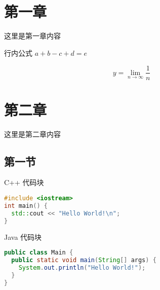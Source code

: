 \documentclass[a4paper]{article}
\begin{document}
\renewcommand{\contentsname}{目\ 录}
\renewcommand{\appendixname}{附录}
\renewcommand{\appendixpagename}{附录}
\renewcommand{\refname}{参考文献} 
\renewcommand{\figurename}{图}
\renewcommand{\tablename}{表}
\renewcommand{\today}{\number\year 年 \number\month 月 \number\day 日}


\begin{titlepage}

\begin{center}
  \vspace*{36pt}
   \\
  \vspace*{24pt}
   \\
  \vspace*{380pt}
\end{center}
\date{\today}
\author{wjl}
\end{titlepage}

\newpage


\section{第一章}\label{sec1}

这里是第一章内容

行内公式 $a + b - c + d = e$

\[
y = \lim_{n \to \infty} \frac{1}{n}  
\]

\section{第二章}\label{sec2}

这里是第二章内容

\subsection{第一节}\label{sec2:sub1}

C++ 代码块

\begin{lstlisting}[language=c++]
#include <iostream>
int main() {
  std::cout << "Hello World!\n";
}
\end{lstlisting}

Java 代码块

\begin{lstlisting}[language=java]
public class Main {
  public static void main(String[] args) {
    System.out.println("Hello World!");
  }
}
\end{lstlisting}
\end{document}
